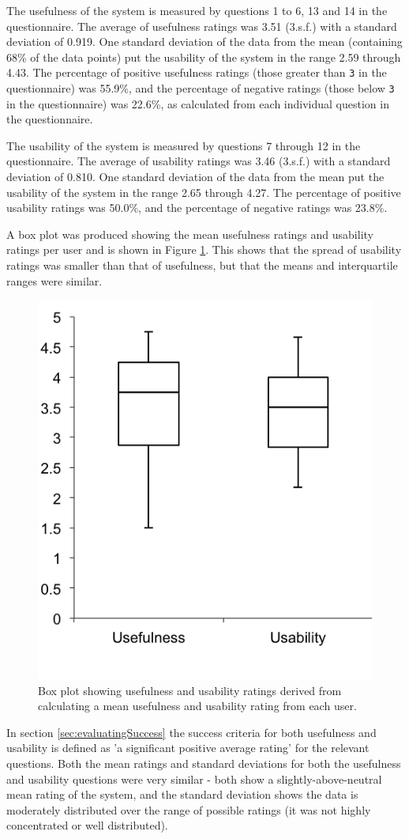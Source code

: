 \documentclass[authoryearcitations]{UoYCSproject}
\begin{document}
The usefulness of the system is measured by questions 1 to 6, 13 and 14 in the questionnaire. The average of usefulness ratings was 3.51 (3.s.f.) with a standard deviation of 0.919. One standard deviation of the data from the mean (containing 68\% of the data points) put the usability of the system in the range 2.59 through 4.43. The percentage of positive usefulness ratings (those greater than \texttt{3} in the questionnaire) was 55.9\%, and the percentage of negative ratings (those below \texttt{3} in the questionnaire) was 22.6\%, as calculated from each individual question in the questionnaire.

The usability of the system is measured by questions 7 through 12 in the questionnaire.  The average of usability ratings was 3.46 (3.s.f.) with a standard deviation of 0.810. One standard deviation of the data from the mean put the usability of the system in the range 2.65 through 4.27. The percentage of positive usability ratings was 50.0\%, and the percentage of negative ratings was 23.8\%.

A box plot was produced showing the mean usefulness ratings and usability ratings per user and is shown in Figure \ref{fig:boxPlot}. This shows that the spread of usability ratings was smaller than that of usefulness, but that the means and interquartile ranges were similar.

\begin{figure}[htb] 
\centerline{\includegraphics[width=0.55\linewidth]{boxPlot}}
\caption{Box plot showing usefulness and usability ratings derived from calculating a mean usefulness and usability rating from each user.}
\label{fig:boxPlot}
\end{figure}

In section \ref{sec:evaluatingSuccess} the success criteria for both usefulness and usability is defined as 'a significant positive average rating' for the relevant questions. Both the mean ratings and standard deviations for both the usefulness and usability questions were very similar - both show a slightly-above-neutral mean rating of the system, and the standard deviation shows the data is moderately distributed over the range of possible ratings (it was not highly concentrated or well distributed).
\end{document}
